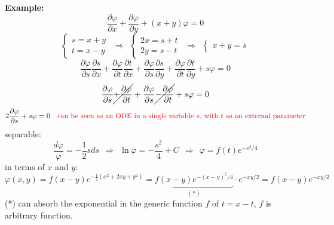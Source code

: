 \documentclass{article}
\newcommand{\vp}{\varphi}
\begin{document}
\vspace{2mm}\noindent
\textbf{Example:}
\begin{equation}
    \frac{\partial \varphi}{\partial x} + \frac{\partial \vp}{\partial y} + (x+y) \vp = 0
\end{equation}
\begin{equation}
    \begin{cases}
        s = x+y \\ t = x-y
    \end{cases} \ \ \Rightarrow \ \ \begin{cases}
        2x = s+t\\ 2y = s-t
    \end{cases} \ \ \Rightarrow \ \ \begin{cases}
        x +y = s
    \end{cases}
\end{equation}
\begin{equation}
    \frac{\partial \varphi}{\partial s} \frac{\partial s}{\partial x}
+ \frac{\partial \varphi}{\partial t} \frac{\partial t}{\partial x}
+ \frac{\partial \varphi}{\partial s} \frac{\partial s}{\partial y}
+ \frac{\partial \varphi}{\partial t} \frac{\partial t}{\partial y}
+ s \varphi = 0
\end{equation}
\begin{equation}
    \frac{\partial \varphi}{\partial s}
\cancel{+ \frac{\partial \varphi}{\partial t}}
+ \frac{\partial \varphi}{\partial s}
\cancel{- \frac{\partial \varphi}{\partial t}}
+ s \varphi = 0
\end{equation}
\begin{equation}
    2 \frac{\partial \vp}{\partial s} + s\vp = 0 \quad \textcolor{red}{\text{can be seen as an ODE in a single variable $s$, with $t$ as an external parameter}}
\end{equation}
separable:
\begin{equation}
    \frac{d \vp}{\vp} = -\frac12 sds \ \ \Rightarrow \ \ \ln{\vp} =- \frac{s^2}{4} + C \ \ \Rightarrow \ \ \vp = f(t) e^{-s^2/4}
\end{equation}
in terms of $x$ and $y$:
\begin{equation}
    \vp(x,y) = f(x-y) e^{-\frac14 (x^2 + 2xy + y^2)} = \underbrace{f(x-y) e^{-(x-y)^2 / 4}}_{(*)} \cdot e^{-xy/2} = f(x-y) e^{-xy/2}
\end{equation}
(*) can absorb the exponential in the generic function $f$ of $t=x-t$, $f$ is arbitrary function.

\newpage
\end{document}
